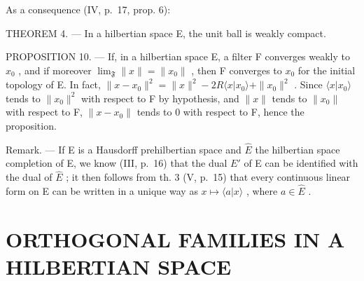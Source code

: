 As a consequence (IV, p.~17, prop. 6):

THEOREM 4. --- In a hilbertian space E, the unit ball is weakly compact.

PROPOSITION 10. --- If, in a hilbertian space E, a filter F converges weakly to \(x_{0}\) , and if moreover \(\lim_{\mathfrak{F}} \|x\| = \|x_{0}\|\) , then F converges to \(x_{0}\) for the initial topology of E. In fact, \(\|x - x_{0}\|^{2} = \|x\|^{2} - 2R \langle x|x_{0} \rangle + \|x_{0}\|^{2}\) . Since \(\langle x|x_{0}\rangle\) tends to \(\|x_{0}\|^{2}\) with respect to F by hypothesis, and \(\|x\|\) tends to \(\|x_{0}\|\) with respect to F, \(\|x - x_{0}\|\) tends to 0 with respect to F, hence the proposition.

Remark. --- If E is a Hausdorff prehilbertian space and \(\hat{E}\) the hilbertian space completion of E, we know (III, p.~16) that the dual \(E'\) of E can be identified with the dual of \(\hat{E}\) ; it then follows from th. 3 (V, p.~15) that every continuous linear form on E can be written in a unique way as \(x \mapsto \langle a|x\rangle\) , where \(a \in \hat{E}\) .

\section{ORTHOGONAL FAMILIES IN A HILBERTIAN SPACE}
